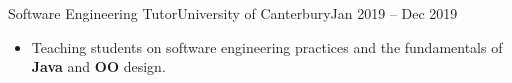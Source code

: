 \begin{cvsubsection}{Software Engineering Tutor}{University of Canterbury}{Jan 2019 -- Dec 2019}
    \begin{itemize}
        \item Teaching students on software engineering practices and the fundamentals of \textbf{Java} and \textbf{OO} design.
    \end{itemize}
\end{cvsubsection}